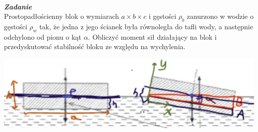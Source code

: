 \documentclass[11pt,a4paper]{article}
\newcounter{zadanie}\newcommand{\zadanie}[1][]{\addtocounter{zadanie}{1} ~\\  {\bf \emph{Zadanie \arabic{zadanie} #1 }} \\}
\begin{document}
\clearpage

\begin{minipage}{0.55\textwidth}
\zadanie
Prostopadłościenny blok o wymiarach $a\times b\times c$ i gęstości $\rho_b$ zanurzono w wodzie o gęstości $\rho_w$ tak, że jedna z jego ścianek była równoległa do tafli wody, a następnie odchylono od pionu o kąt $\alpha$. Obliczyć moment sił działający na blok i przedyskutować stabilność bloku ze względu na wychylenia. 
\end{minipage}
\begin{minipage}{0.45\textwidth}
\begin{center}

\includegraphics[width=1.0\textwidth]{plywanie-zadanie_rozw.png}
\end{center}
\end{minipage}
\end{document}
